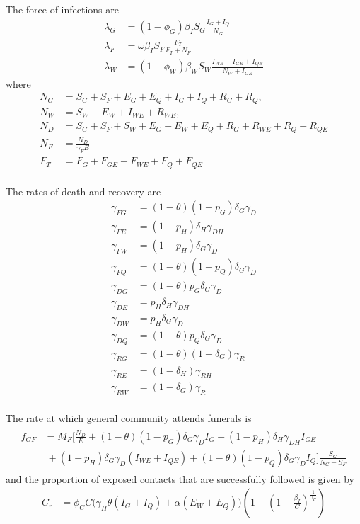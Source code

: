 \documentclass[11pt]{article}
\begin{document}
The force of infections are
\begin{align}
\lambda_G &  = (1-\phi_G)\beta_I S_G \frac{I_G+I_Q}{N_G} \\
\lambda_F & = \omega \beta_I S_F \frac{F_T}{F_T+N_F} \\
\lambda_W & = (1-\phi_W)\beta_W S_W \frac{I_{WE}+I_{GE}+I_{QE}}{N_W+I_{GE}}
\end{align}
where 
\begin{align*}
N_G & = S_G+S_F+E_G+E_Q+I_G+I_Q+R_G+R_Q, \\ 
N_W & = S_W + E_W + I_{WE} + R_{WE}, \\
N_D & = S_G+S_F+S_W+E_G+E_W+E_Q+R_G+R_{WE}+R_Q+R_{QE} \\ 
N_F & = \frac{N_D}{\gamma_F E} \\
F_T & = F_G+F_{GE}+F_{WE}+F_{Q}+F_{QE} \\
\end{align*}


The rates of death and recovery are
\begin{align}
\gamma_{FG} &  = (1-\theta)(1-p_G)\delta_G \gamma_D  \\
\gamma_{FE} &  =(1-p_H)\delta_H \gamma_{DH}  \\
\gamma_{FW} &  =(1-p_H)\delta_G \gamma_D  \\
\gamma_{FQ} &  =(1-\theta)(1-p_Q)\delta_G \gamma_D  \\
\gamma_{DG} & = (1-\theta)p_G\delta_G \gamma_D \\
\gamma_{DE} & = p_H\delta_H \gamma_{DH} \\
\gamma_{DW} & = p_H\delta_G \gamma_D \\
\gamma_{DQ} & = (1-\theta)p_Q\delta_G \gamma_D \\
\gamma_{RG} & = (1-\theta)(1-\delta_G) \gamma_R \\
\gamma_{RE} & = (1-\delta_H) \gamma_{RH}\\
\gamma_{RW} & = (1-\delta_G) \gamma_R \\
\end{align}

The rate at which general community attends funerals is
\begin{eqnarray}
\begin{split}
f_{GF} & = M_F  \Bigg[\frac{N_D}{E} + (1-\theta)(1-p_G)\delta_G
  \gamma_DI_G  + (1-p_H)\delta_H \gamma_{DH}I_{GE} \\
& ~+ (1-p_H)\delta_G\gamma_D(I_{WE}+I_{QE}) + (1-\theta)(1-p_Q)\delta_G
  \gamma_DI_Q \Bigg] \frac{S_G}{N_G-S_F} 
\end{split}
\end{eqnarray}
and the proportion of exposed contacts that are successfully followed
is given by
\begin{align}
C_r & = \phi_C C\big(\gamma_H \theta(I_G+I_Q )+\alpha(E_W+E_Q)\big)
\left(1-\left(1-\frac{\beta_I}{C}\right)^{\frac{1}{\gamma_H}}
   \right) 
\end{align}
\end{document}
